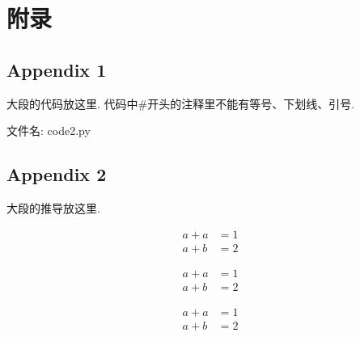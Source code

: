 \documentclass{urtemp}
\begin{document}

\renewcommand\refname{\heiti\xiaosihao\centerline{参考文献}\global\def\refname{参考文献}}
\vskip 12pt

\let\OLDthebibliography\thebibliography
\renewcommand\thebibliography[1]{
    \OLDthebibliography{#1}
    \setlength{\parskip}{0pt}
    \setlength{\itemsep}{0pt plus 0.3ex}
}

{
\renewcommand{\baselinestretch}{0.9}


}

\setcounter{equation}{0}
\renewcommand{\theequation}{A.\arabic{equation}}

\section*{附录}

\subsection*{Appendix 1}\label{app1}

大段的代码放这里. 代码中\#开头的注释里不能有等号、下划线、引号.

文件名: code2.py


\subsection*{Appendix 2}

大段的推导放这里.

$$
\begin{aligned}
    a+a&=1\\
    a+b&=2
\end{aligned}
$$

\begin{equation}
\begin{aligned}
    a+a&=1\\
    a+b&=2
\end{aligned}\label{eqA1}
\end{equation}

\begin{subequations}
    \begin{align}
        a+a&=1\label{eqA2}\\
        a+b&=2\label{eqA3}
    \end{align}
\end{subequations}
    
\end{document}
